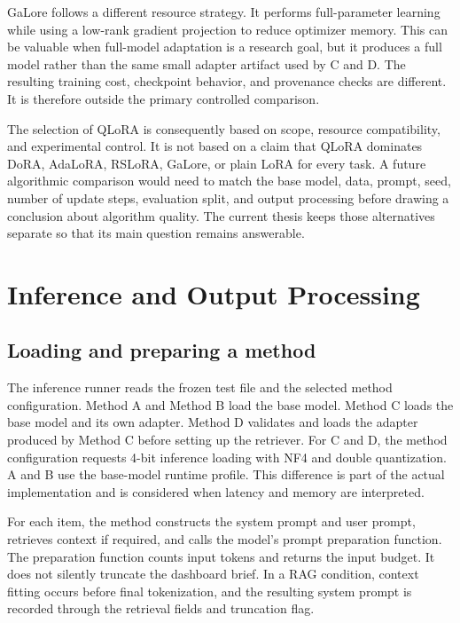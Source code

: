GaLore follows a different resource strategy. It performs full-parameter learning while using a low-rank gradient projection to reduce optimizer memory. This can be valuable when full-model adaptation is a research goal, but it produces a full model rather than the same small adapter artifact used by C and D. The resulting training cost, checkpoint behavior, and provenance checks are different. It is therefore outside the primary controlled comparison.

The selection of QLoRA is consequently based on scope, resource compatibility, and experimental control. It is not based on a claim that QLoRA dominates DoRA, AdaLoRA, RSLoRA, GaLore, or plain LoRA for every task. A future algorithmic comparison would need to match the base model, data, prompt, seed, number of update steps, evaluation split, and output processing before drawing a conclusion about algorithm quality. The current thesis keeps those alternatives separate so that its main question remains answerable.

\section{Inference and Output Processing}

\subsection{Loading and preparing a method}

The inference runner reads the frozen test file and the selected method configuration. Method A and Method B load the base model. Method C loads the base model and its own adapter. Method D validates and loads the adapter produced by Method C before setting up the retriever. For C and D, the method configuration requests 4-bit inference loading with NF4 and double quantization. A and B use the base-model runtime profile. This difference is part of the actual implementation and is considered when latency and memory are interpreted.

For each item, the method constructs the system prompt and user prompt, retrieves context if required, and calls the model's prompt preparation function. The preparation function counts input tokens and returns the input budget. It does not silently truncate the dashboard brief. In a RAG condition, context fitting occurs before final tokenization, and the resulting system prompt is recorded through the retrieval fields and truncation flag.

